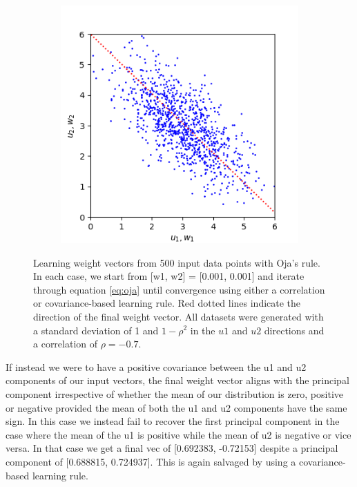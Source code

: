 \documentclass{article}
\begin{document}
\begin{figure}[h]
\begin{subfigure}[t]{0.30\linewidth}
		\label{fig:sim2mul}	
	\end{subfigure}%
	\hspace{0.03\linewidth}
	\begin{subfigure}[t]{0.30\linewidth}
		\centering
		\includegraphics[width = 1.0\linewidth, trim={0 0 0 0}, clip=true]{figures/2d_sim3.png}
		\label{fig:sim3mul}	
	\end{subfigure}%
\caption{Learning weight vectors from 500 input data points with Oja's rule. In each case, we start from [w1, w2] = [0.001, 0.001] and iterate through equation \ref{eq:oja} until convergence using either a correlation or covariance-based learning rule. Red dotted lines indicate the direction of the final weight vector. All datasets were generated with a standard deviation of 1 and $1-\rho^2$ in the $u1$ and $u2$ directions and a correlation of $\rho = -0.7$.}
\label{fig:multiplicative}
\end{figure}

If instead we were to have a positive covariance between the u1 and u2 components of our input vectors, the final weight vector aligns with the principal component irrespective of whether the mean of our distribution is zero, positive or negative provided the mean of both the u1 and u2 components have the same sign. In this case we instead fail to recover the first principal component in the case where the mean of the u1 is positive while the mean of u2 is negative or vice versa. In that case we get a final vec of [0.692383, -0.72153] despite a principal component of [0.688815, 0.724937]. This is again salvaged by using a covariance-based learning rule.
\end{document}
